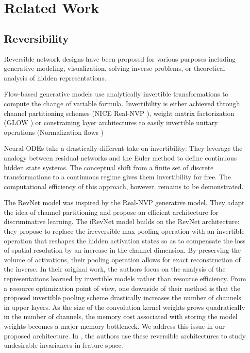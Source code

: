 \documentclass[twocolumn]{bmcart}
\begin{document}
\section{Related Work}
\subsection{Reversibility}

Reversible network designs have been proposed for various purposes including generative modeling, visualization, solving inverse problems, or theoretical analysis of hidden representations.

Flow-based generative models use analytically invertible transformations to compute the change of variable formula. Invertibility is either achieved through channel partitioning schemes (NICE \cite{dinh2014nice} Real-NVP \cite{dinh2016density}), weight matrix factorization (GLOW \cite{kingma2018glow}) or constraining layer architectures to easily invertible unitary operations (Normalization flows \cite{rezende2015variational})

Neural ODEs \cite{chen2018neural} take a drastically different take on invertibility: They leverage the analogy between residual networks and the Euler method to define continuous hidden state systems.
The conceptual shift from a finite set of discrete transformations to a continuous regime gives them invertibility for free.
The computational efficiency of this approach, however, remains to be demonstrated.

The RevNet model \cite{gomez2017reversible} was inspired by the Real-NVP generative model. They adapt the idea of channel partitioning and propose an efficient architecture for discriminative learning.
The iRevNet \cite{jacobsen2018revnet} model builds on the RevNet architecture: they propose to replace the irreversible max-pooling operation with an invertible operation that reshapes the hidden activation states
so as to compensate the loss of spatial resolution by an increase in the channel dimension.
By preserving the volume of activations, their pooling operation allows for exact reconstruction of the inverse.
In their original work, the authors focus on the analysis of the representations learned by invertible models rather than resource efficiency.
From a resource optimization point of view, one downside of their method is that the proposed invertible pooling scheme drastically increases the number of channels in upper layers.
As the size of the convolution kernel weights grows quadratically in the number of channels, the memory cost associated with storing the model weights becomes a major memory bottleneck.
We address this issue in our proposed architecture.
In \cite{jacobsen2018excessive}, the authors use these reversible architectures to study undesirable invariances in feature space.
\end{document}
